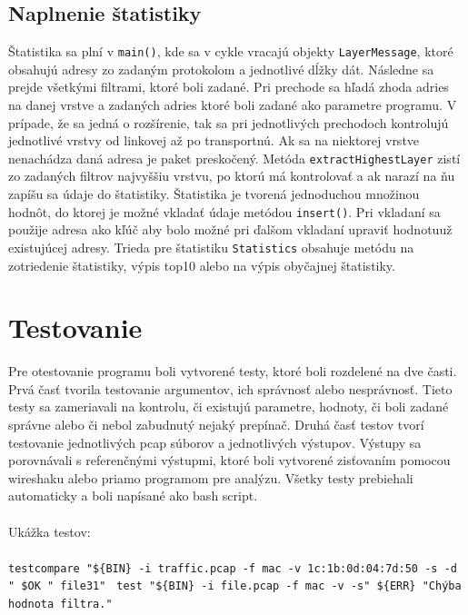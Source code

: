 \documentclass[10pt,a4paper,final]{article}
\begin{document}
\subsection{Naplnenie štatistiky}
Štatistika sa plní v \texttt{main()}, kde sa v cykle vracajú objekty \texttt{LayerMessage}, ktoré obsahujú adresy zo zadaným protokolom a jednotlivé dĺžky dát. Následne sa prejde všetkými filtrami, ktoré boli zadané. Pri prechode sa hľadá zhoda adries na danej vrstve a zadaných adries ktoré boli zadané ako parametre programu. V prípade, že sa jedná o rozšírenie, tak sa pri jednotlivých prechodoch kontrolujú jednotlivé vrstvy od linkovej až po transportnú. Ak sa na niektorej vrstve nenachádza daná adresa je paket preskočený. Metóda \texttt{extractHighestLayer} zistí zo zadaných filtrov najvyššiu vrstvu, po ktorú má kontrolovať a ak narazí na ňu zapíšu sa údaje do štatistiky. Štatistika je tvorená jednoduchou množinou hodnôt, do ktorej je možné vkladať údaje metódou \texttt{insert()}. Pri vkladaní sa použije adresa ako kľúč aby bolo možné pri ďalšom vkladaní upraviť hodnotuuž existujúcej adresy. Trieda pre štatistiku \texttt{Statistics} obsahuje metódu na zotriedenie štatistiky, výpis top10 alebo na výpis obyčajnej štatistiky.

\section{Testovanie}
Pre otestovanie programu boli vytvorené testy, ktoré boli rozdelené na dve časti. Prvá časť tvorila testovanie argumentov, ich správnosť alebo nesprávnosť. Tieto testy sa zameriavali na kontrolu, či existujú parametre, hodnoty, či boli zadané správne alebo či nebol zabudnutý nejaký prepínač. Druhá časť testov tvorí testovanie jednotlivých pcap súborov a jednotlivých výstupov. Výstupy sa porovnávali s referenčnými výstupmi, ktoré boli vytvorené zisťovaním pomocou wireshaku alebo priamo programom pre analýzu. Všetky testy prebiehali automaticky a boli napísané ako bash script.
\\\\
Ukážka testov:
\\\\
\texttt{testcompare "\$\{BIN\} -i traffic.pcap -f mac -v 1c:1b:0d:04:7d:50 -s -d
      " \$OK " file31" }
\texttt{test "\$\{BIN\} -i file.pcap -f mac -v -s" \$\{ERR\} "Chýba hodnota filtra."}
\end{document}
